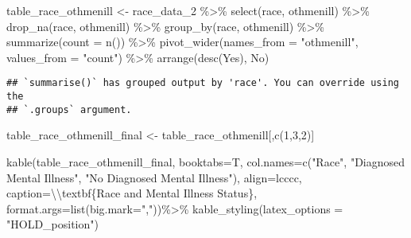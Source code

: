 \documentclass[
]{article}
\newenvironment{Shaded}{\begin{snugshade}}{\end{snugshade}}
\newcommand{\AttributeTok}[1]{\textcolor[rgb]{0.77,0.63,0.00}{#1}}
\newcommand{\DecValTok}[1]{\textcolor[rgb]{0.00,0.00,0.81}{#1}}
\newcommand{\FunctionTok}[1]{\textcolor[rgb]{0.00,0.00,0.00}{#1}}
\newcommand{\NormalTok}[1]{#1}
\newcommand{\OtherTok}[1]{\textcolor[rgb]{0.56,0.35,0.01}{#1}}
\newcommand{\SpecialCharTok}[1]{\textcolor[rgb]{0.00,0.00,0.00}{#1}}
\newcommand{\StringTok}[1]{\textcolor[rgb]{0.31,0.60,0.02}{#1}}
\begin{document}
\begin{Shaded}
\begin{Highlighting}[]
\NormalTok{table\_race\_othmenill }\OtherTok{\textless{}{-}}\NormalTok{ race\_data\_2 }\SpecialCharTok{\%\textgreater{}\%}
  \FunctionTok{select}\NormalTok{(race, othmenill) }\SpecialCharTok{\%\textgreater{}\%}
  \FunctionTok{drop\_na}\NormalTok{(race, othmenill) }\SpecialCharTok{\%\textgreater{}\%}
  \FunctionTok{group\_by}\NormalTok{(race, othmenill) }\SpecialCharTok{\%\textgreater{}\%}
  \FunctionTok{summarize}\NormalTok{(}\AttributeTok{count =} \FunctionTok{n}\NormalTok{()) }\SpecialCharTok{\%\textgreater{}\%}
  \FunctionTok{pivot\_wider}\NormalTok{(}\AttributeTok{names\_from =} \StringTok{"othmenill"}\NormalTok{, }\AttributeTok{values\_from =} \StringTok{"count"}\NormalTok{) }\SpecialCharTok{\%\textgreater{}\%}
  \FunctionTok{arrange}\NormalTok{(}\FunctionTok{desc}\NormalTok{(Yes), No)}
\end{Highlighting}
\end{Shaded}

\begin{verbatim}
## `summarise()` has grouped output by 'race'. You can override using the
## `.groups` argument.
\end{verbatim}

\begin{Shaded}
\begin{Highlighting}[]
\NormalTok{table\_race\_othmenill\_final }\OtherTok{\textless{}{-}}\NormalTok{ table\_race\_othmenill[,}\FunctionTok{c}\NormalTok{(}\DecValTok{1}\NormalTok{,}\DecValTok{3}\NormalTok{,}\DecValTok{2}\NormalTok{)]}

\FunctionTok{kable}\NormalTok{(table\_race\_othmenill\_final, }
      \AttributeTok{booktabs=}\NormalTok{T, }
      \AttributeTok{col.names=}\FunctionTok{c}\NormalTok{(}\StringTok{"Race"}\NormalTok{, }\StringTok{"Diagnosed Mental Illness"}\NormalTok{, }\StringTok{"No Diagnosed Mental Illness"}\NormalTok{),}
      \AttributeTok{align=}\StringTok{\textquotesingle{}lcccc\textquotesingle{}}\NormalTok{, }
      \AttributeTok{caption=}\StringTok{\textquotesingle{}}\SpecialCharTok{\textbackslash{}\textbackslash{}}\StringTok{textbf\{Race and Mental Illness Status\}\textquotesingle{}}\NormalTok{,}
      \AttributeTok{format.args=}\FunctionTok{list}\NormalTok{(}\AttributeTok{big.mark=}\StringTok{","}\NormalTok{))}\SpecialCharTok{\%\textgreater{}\%}
  \FunctionTok{kable\_styling}\NormalTok{(}\AttributeTok{latex\_options =} \StringTok{"HOLD\_position"}\NormalTok{)}
\end{Highlighting}
\end{Shaded}
\end{document}
